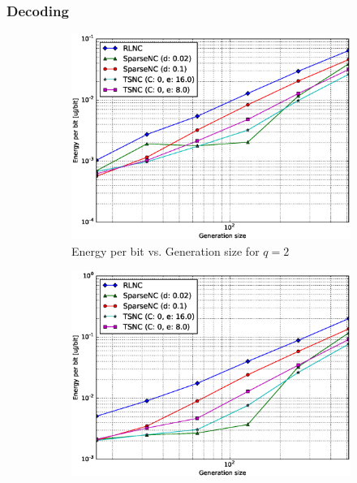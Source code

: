\subsubsection{Decoding}

\begin{figure}
    \centering
    \begin{subfigure}[b]{0.475\textwidth}
        \centering
        \includegraphics[width=1.1\textwidth]{images/06_06_2016/energy_per_bit_vs_generation_size_Rasp_Binary_decoder_1600.eps}
        \caption[]%
        {{\small Energy per bit vs. Generation size for $q = 2$}}
        \label{fig:dec_ene_rasp1_gen_gf2}
    \end{subfigure}
    \hfill
    \begin{subfigure}[b]{0.475\textwidth}
        \centering
        \includegraphics[width=1.1\textwidth]{images/06_06_2016/energy_per_bit_vs_generation_size_Rasp_Binary8_decoder_1600.eps}

\end{subfigure}
\end{figure}
